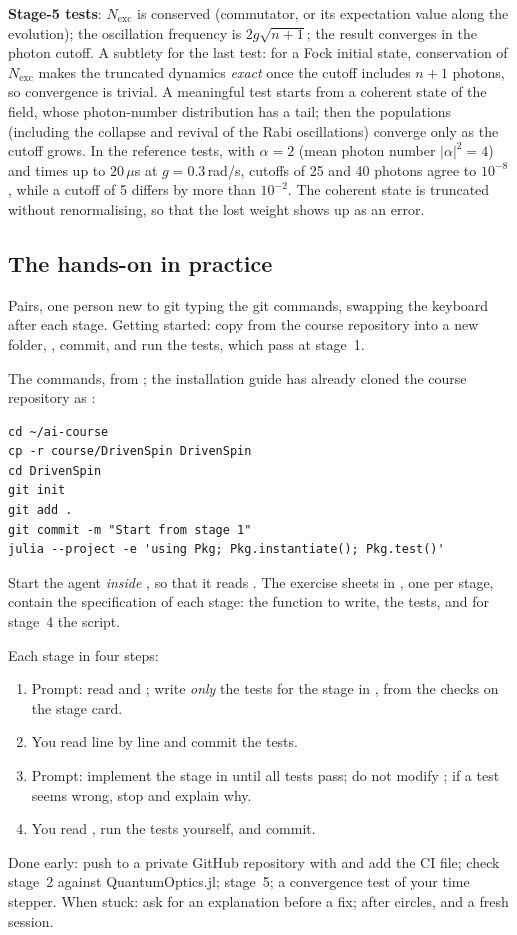 \textbf{Stage-5 tests}: $N_{\mathrm{exc}}$ is conserved (commutator, or its expectation
value along the evolution); the oscillation frequency is $2g\sqrt{n+1}$; the result
converges in the photon cutoff. A subtlety for the last test: for a Fock initial state,
conservation of $N_{\mathrm{exc}}$ makes the truncated dynamics \emph{exact} once the cutoff
includes $n + 1$ photons, so convergence is trivial. A meaningful test starts from a coherent state
of the field, whose photon-number distribution has a tail; then the populations
(including the collapse and revival of the Rabi oscillations) converge only as the cutoff
grows. In the reference tests, with $\alpha = 2$ (mean photon number $|\alpha|^2 = 4$)
and times up to $20\,\mu$s at $g = 0.3$\,rad/\textmu s, cutoffs of 25 and 40 photons agree to $10^{-8}$, while a cutoff of 5 differs by more than
$10^{-2}$. The coherent state is truncated without renormalising, so that the lost weight
shows up as an error.

\subsection{The hands-on in practice}\label{sec:handson}

Pairs, one person new to git typing the git commands, swapping the keyboard after each
stage. Getting started: copy  from the course repository into a new
folder, , commit, and run the tests, which pass at stage~1.

The commands, from ; the installation guide has
already cloned the course repository as :
\begin{lstlisting}
cd ~/ai-course
cp -r course/DrivenSpin DrivenSpin
cd DrivenSpin
git init
git add .
git commit -m "Start from stage 1"
julia --project -e 'using Pkg; Pkg.instantiate(); Pkg.test()'
\end{lstlisting}
Start the agent \emph{inside} , so that it reads . The
exercise sheets in , one per stage, contain the specification of
each stage: the function to write, the tests, and for stage~4 the script.

Each stage in four steps:
\begin{enumerate}
  \item Prompt: read  and ; write \emph{only} the tests for the
        stage in , from the checks on the stage card.
  \item You read  line by line and commit the tests.
  \item Prompt: implement the stage in  until all tests pass; do not modify
        ; if a test seems wrong, stop and explain why.
  \item You read , run the tests yourself, and commit.
\end{enumerate}
Done early: push to a private GitHub repository with
 and add the CI file; check
stage~2 against QuantumOptics.jl; stage~5; a convergence test of your time stepper. When
stuck: ask for an explanation before a fix; after circles,  and a fresh
session.
